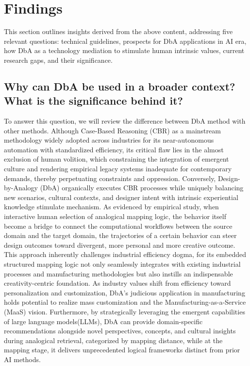 \section{Findings}
This section outlines insights derived from the above content, addressing five relevant questions: technical guidelines, prospects for DbA applications in AI era, how DbA as a technology mediation to stimulate human intrinsic values, current research gaps, and their significance.


\subsection{Why can DbA be used in a broader context? What is the significance behind it?}
To answer this question, we will review the difference between DbA method with other methods. Although Case-Based Reasoning (CBR) as a mainstream methodology widely adopted across industries for its near-autonomous automation with standardized efficiency, its critical flaw lies in the almost exclusion of human volition, which constraining the integration of emergent culture and rendering empirical legacy systems inadequate for contemporary demands, thereby perpetuating constraints and oppression\cite{wills1994towards, goel2012cognitive}. Conversely, Design-by-Analogy (DbA) organically executes CBR processes while uniquely balancing new scenarios\cite{Ju2025toward}, cultural contexts\cite{cao2025medai}, and designer intent with intrinsic experiential knowledge stimulate mechanism\cite{warner2023interactive}. As evidenced by empirical study, when interactive human selection of analogical mapping logic, the behavior itself become a bridge to connect the computational workflows between the source domain and the target domain, the trajectories of a certain behavior can steer design outcomes toward divergent, more personal and more creative outcome\cite{chan2011benefits, moreno2015step, moreno2016overcoming}. This approach inherently challenges industrial efficiency dogma, for its embedded structured mapping logic not only seamlessly integrates with existing industrial processes and manufacturing methodologies but also instills an indispensable creativity-centric foundation. As industry values shift from efficiency toward personalization and customization, DbA’s judicious application in manufacturing holds potential to realize mass customization and the Manufacturing-as-a-Service (MaaS) vision\cite{zhong2017intelligent}. Furthermore, by strategically leveraging the emergent capabilities of large language models(LLMs), DbA can provide domain-specific recommendations alongside novel perspectives, concepts, and cultural insights during analogical retrieval, categorized by mapping distance, while at the mapping stage, it delivers unprecedented logical frameworks distinct from prior AI methods.
